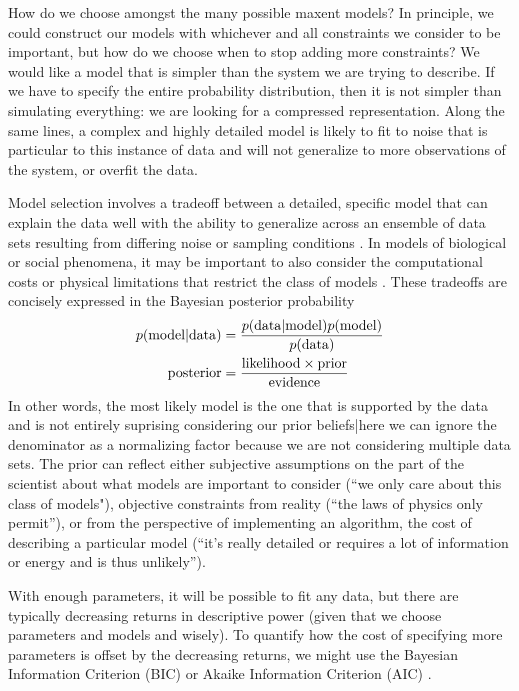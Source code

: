 \documentclass[aps,prl,twocolumn]{revtex4-1}
\begin{document}
How do we choose amongst the many possible maxent models? In principle, we could construct our models with whichever and all constraints we consider to be important, but how do we choose when to stop adding more constraints?
We would like a model that is simpler than the system we are trying to describe. If we have to specify the entire probability distribution, then it is not simpler than simulating everything: we are looking for a compressed representation. Along the same lines, a complex and highly detailed model is likely to fit to noise that is particular to this instance of data and will not generalize to more observations of the system, or overfit the data.

Model selection involves a tradeoff between a detailed, specific model that can explain the data well with the ability to generalize across an ensemble of data sets resulting from differing noise or sampling conditions \cite{MacKay:2005wc}. In models of biological or social phenomena, it may be important to also consider the computational costs or physical limitations that restrict the class of models \cite{Daniels:1cq}. These tradeoffs are concisely expressed in the Bayesian posterior probability
\begin{align}
	p({\rm model}|{\rm data}) &= \frac{p({\rm data}|{\rm model})p({\rm model})}{p({\rm data})}\\
	{\rm posterior} &= \frac{{\rm likelihood}\times{\rm prior}}{{\rm evidence}}
\end{align}
In other words, the most likely model is the one that is supported by the data and is not entirely suprising considering our prior beliefs|here we can ignore the denominator as a normalizing factor because we are not considering multiple data sets. The prior can reflect either subjective assumptions on the part of the scientist about what models are important to consider (``we only care about this class of models"), objective constraints from reality (``the laws of physics only permit''), or from the perspective of implementing an algorithm, the cost of describing a particular model (``it's really detailed or requires a lot of information or energy and is thus unlikely''). 

With enough parameters, it will be possible to fit any data, but there are typically decreasing returns in descriptive power (given that we choose parameters and models and wisely). 
To quantify how the cost of specifying more parameters is offset by the decreasing returns, we might use the Bayesian Information Criterion (BIC) or Akaike Information Criterion (AIC) \cite{Lee:2015ev}.
\end{document}
